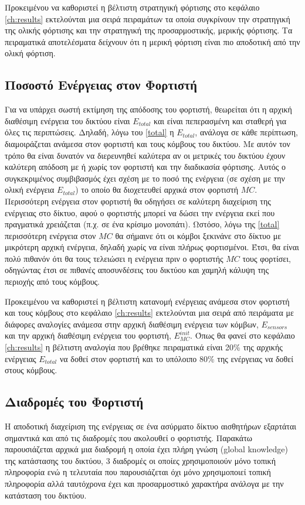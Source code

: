Προκειμένου να καθοριστεί η βέλτιστη στρατηγική φόρτισης στο κεφάλαιο \ref{ch:results} εκτελούνται μια σειρά πειραμάτων τα οποία συγκρίνουν την στρατηγική της ολικής
φόρτισης και την στρατηγική της προσαρμοστικής, μερικής φόρτισης. Τα πειραματικά αποτελέσματα δείχνουν ότι η μερική φόρτιση είναι πιο αποδοτική από την ολική φόρτιση.

\subsection{Ποσοστό Ενέργειας στον Φορτιστή}
Για να υπάρχει σωστή εκτίμηση της απόδοσης του φορτιστή, θεωρείται ότι η αρχική διαθέσιμη ενέργεια του δικτύου είναι $E_{total}$ και είναι πεπερασμένη και σταθερή
για όλες τις περιπτώσεις. Δηλαδή, λόγω του \ref{total} η $E_{total}$, ανάλογα σε κάθε περίπτωση, διαμοιράζεται ανάμεσα στον φορτιστή και τους κόμβους του δικτύου. Με
αυτόν τον τρόπο θα είναι δυνατόν να διερευνηθεί καλύτερα αν οι μετρικές του δικτύου έχουν καλύτερη απόδοση με ή χωρίς τον φορτιστή και την διαδικασία φόρτισης. Αυτός
ο συγκεκριμένος συμβιβασμός έχει σχέση με το ποσό της ενέργεια (σε σχέση με την ολική ενέργεια $E_{total}$) το οποίο θα διοχετευθεί αρχικά στον φορτιστή $MC$.
Περισσότερη ενέργεια στον φορτιστή θα οδηγήσει σε καλύτερη διαχείριση της ενέργειας στο δίκτυο, αφού ο φορτιστής μπορεί να δώσει την ενέργεια εκεί που πραγματικά
χρειάζεται (π.χ. σε ένα κρίσιμο μονοπάτι). Ωστόσο, λόγω της \ref{total} περισσότερη ενέργεια στον $MC$ θα σήμαινε ότι οι κόμβοι ξεκινάνε στο δίκτυο με μικρότερη
αρχική ενέργεια, δηλαδή χωρίς να είναι πλήρως φορτισμένοι. Έτσι, θα είναι πολύ πιθανόν ότι θα τους τελειώσει η ενέργεια πριν ο φορτιστής $MC$ τους φορτίσει,
οδηγώντας έτσι σε πιθανές αποσυνδέσεις του δικτύου και χαμηλή κάλυψη της περιοχής από τους κόμβους.

Προκειμένου να καθοριστεί η βέλτιστη κατανομή ενέργειας ανάμεσα στον φορτιστή και τους κόμβους στο κεφάλαιο \ref{ch:results} εκτελούνται μια σειρά από πειράματα με
διάφορες αναλογίες ανάμεσα στην αρχική διαθέσιμη ενέργεια των κόμβων, $E_{sensors}$ και την αρχική διαθέσιμη ενέργεια του φορτιστή, $E^{init}_{MC}$. Όπως θα φανεί στο
κεφάλαιο \ref{ch:results} η βέλτιστη αναλογία που βρέθηκε πειραματικά είναι 20\% της αρχικής ενέργειας $E_{total}$ να δοθεί στον φορτιστή και το υπόλοιπο 80\% της
ενέργειας να δοθεί στους κόμβους.

\subsection{Διαδρομές του Φορτιστή}
Η αποδοτική διαχείριση της ενέργειας σε ένα ασύρματο δίκτυο αισθητήρων εξαρτάται σημαντικά και από τις διαδρομές που ακολουθεί ο φορτιστής. Παρακάτω παρουσιάζεται
αρχικά μια διαδρομή η οποία έχει πλήρη γνώση (global knowledge) της κατάστασης του δικτύου, 3 διαδρομές οι οποίες χρησιμοποιούν μόνο τοπική πληροφορία ενώ η
τελευταία που παρουσιάζεται όχι μόνο χρησιμοποιεί τοπική πληροφορία αλλά ταυτόχρονα έχει και προσαρμοστικό χαρακτήρα ανάλογα με την κατάσταση του δικτύου.

